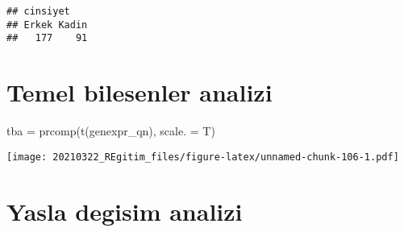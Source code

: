 \documentclass[
]{book}
\newenvironment{Shaded}{\begin{snugshade}}{\end{snugshade}}
\newcommand{\AttributeTok}[1]{\textcolor[rgb]{0.77,0.63,0.00}{#1}}
\newcommand{\DecValTok}[1]{\textcolor[rgb]{0.00,0.00,0.81}{#1}}
\newcommand{\FloatTok}[1]{\textcolor[rgb]{0.00,0.00,0.81}{#1}}
\newcommand{\FunctionTok}[1]{\textcolor[rgb]{0.00,0.00,0.00}{#1}}
\newcommand{\NormalTok}[1]{#1}
\newcommand{\OtherTok}[1]{\textcolor[rgb]{0.56,0.35,0.01}{#1}}
\newcommand{\SpecialCharTok}[1]{\textcolor[rgb]{0.00,0.00,0.00}{#1}}
\newcommand{\StringTok}[1]{\textcolor[rgb]{0.31,0.60,0.02}{#1}}
\begin{document}
\begin{verbatim}
## cinsiyet
## Erkek Kadin 
##   177    91
\end{verbatim}

\hypertarget{temel-bilesenler-analizi}{%
\chapter{Temel bilesenler analizi}\label{temel-bilesenler-analizi}}

\begin{Shaded}
\begin{Highlighting}[]
\NormalTok{tba }\OtherTok{=} \FunctionTok{prcomp}\NormalTok{(}\FunctionTok{t}\NormalTok{(genexpr\_qn), }\AttributeTok{scale. =}\NormalTok{ T)}
\end{Highlighting}
\end{Shaded}

\begin{Shaded}
\end{Shaded}

\texttt{[image: 20210322\_REgitim\_files/figure-latex/unnamed-chunk-106-1.pdf]}

\hypertarget{yasla-degisim-analizi}{%
\chapter{Yasla degisim analizi}\label{yasla-degisim-analizi}}
\end{document}
